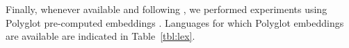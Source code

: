 \documentclass[11pt,letterpaper]{article}
\begin{document}
Finally, whenever available and following \citet{plank16}, we performed experiments using Polyglot pre-computed
embeddings \cite{alrfou13}. Languages for which Polyglot embeddings are available are indicated in Table~\ref{tbl:lex}.

\end{document}
